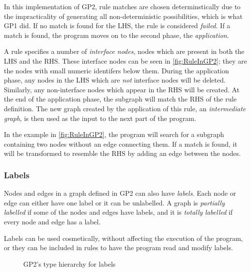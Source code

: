 \documentclass[authoryearcitations]{UoYCSproject}
\begin{document}
In this implementation of GP2, rule matches are chosen determinstically due to the
impracticality of generating all non-deterministic possibilities, which is what GP1 did.
If no match is found for the LHS, the rule is considered \emph{failed}. If a match is
found, the program moves on to the second phase, the \emph{application}.

A rule specifies a number of \emph{interface nodes}, nodes which are present in both
the LHS and the RHS. These interface nodes can be seen in \autoref{fig:RuleInGP2}; they
are the nodes with small numeric identifers below them. During the application phase,
any nodes in the LHS which are \emph{not} interface nodes will be deleted. Similarly,
any non-interface nodes which appear in the RHS will be created. At the end of the
application phase, the subgraph will match the RHS of the rule definition. The new
graph created by the application of this rule, an \emph{intermediate graph}, is then
used as the input to the next part of the program.

In the example in \autoref{fig:RuleInGP2}, the program will search for a subgraph
containing two nodes without an edge connecting them. If a match is found, it will
be transformed to resemble the RHS by adding an edge between the nodes.


\subsubsection{Labels}
\label{sec:Labels}

Nodes and edges in a graph defined in GP2 can also have \emph{labels}. Each node
or edge can either have one label or it can be unlabelled. A graph is
\emph{partially labelled} if some of the nodes and edges have labels, and it is
\emph{totally labelled} if every node and edge has a label.

Labels can be used cosmetically, without affecting the execution of the program,
or they can be included in rules to have the program read and modify labels.

\begin{figure}
    \begin{center}
    \end{center}
    \caption{GP2's type hierarchy for labels}
    \label{fig:TypeHierarchy}
\end{figure}
\end{document}
